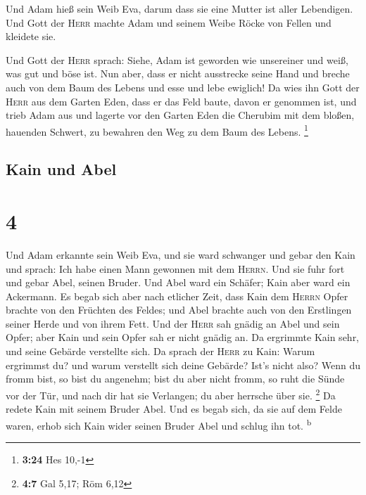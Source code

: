  Und Adam hieß sein Weib Eva, darum dass sie eine Mutter
ist aller Lebendigen.  Und Gott der \textsc{Herr} machte
Adam und seinem Weibe Röcke von Fellen und kleidete sie.

 Und Gott der \textsc{Herr} sprach: Siehe, Adam ist
geworden wie unsereiner und weiß, was gut und böse ist. Nun aber, dass
er nicht ausstrecke seine Hand und breche auch von dem Baum des Lebens
und esse und lebe ewiglich!  Da wies ihn Gott der
\textsc{Herr} aus dem Garten Eden, dass er das Feld baute, davon er
genommen ist,  und trieb Adam aus und lagerte vor den
Garten Eden die Cherubim mit dem bloßen, hauenden Schwert, zu bewahren
den Weg zu dem Baum des Lebens. \footnote{\textbf{3:24} Hes 10,-1}

\hypertarget{kain-und-abel}{%
\subsection{Kain und Abel}\label{kain-und-abel}}

\hypertarget{section-3}{%
\section{4}\label{section-3}}

 Und Adam erkannte sein Weib Eva, und sie ward schwanger
und gebar den Kain und sprach: Ich habe einen Mann gewonnen mit dem
\textsc{Herrn}.  Und sie fuhr fort und gebar Abel, seinen
Bruder. Und Abel ward ein Schäfer; Kain aber ward ein Ackermann.
 Es begab sich aber nach etlicher Zeit, dass Kain dem
\textsc{Herrn} Opfer brachte von den Früchten des Feldes; 
und Abel brachte auch von den Erstlingen seiner Herde und von ihrem
Fett. Und der \textsc{Herr} sah gnädig an Abel und sein Opfer;
 aber Kain und sein Opfer sah er nicht gnädig an. Da
ergrimmte Kain sehr, und seine Gebärde verstellte sich. 
Da sprach der \textsc{Herr} zu Kain: Warum ergrimmst du? und warum
verstellt sich deine Gebärde?  Ist's nicht also? Wenn du
fromm bist, so bist du angenehm; bist du aber nicht fromm, so ruht die
Sünde vor der Tür, und nach dir hat sie Verlangen; du aber herrsche über
sie. \footnote{\textbf{4:7} Gal 5,17; Röm 6,12}  Da redete
Kain mit seinem Bruder Abel. Und es begab sich, da sie auf dem Felde
waren, erhob sich Kain wider seinen Bruder Abel und schlug ihn tot.
\textsuperscript{b}

